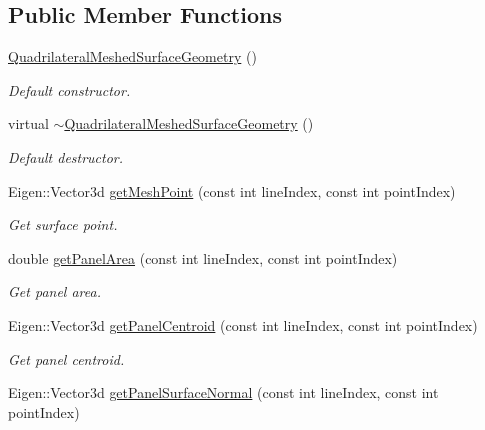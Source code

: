\subsection*{Public Member Functions}
\begin{DoxyCompactItemize}
\item 
\hyperlink{classtudat_1_1geometric__shapes_1_1QuadrilateralMeshedSurfaceGeometry_a2f7ff3d50469568067a7655183d9b115}{Quadrilateral\+Meshed\+Surface\+Geometry} ()
\begin{DoxyCompactList}\small\item\em Default constructor. \end{DoxyCompactList}\item 
virtual \hyperlink{classtudat_1_1geometric__shapes_1_1QuadrilateralMeshedSurfaceGeometry_aee32ab94bdba6e333c6e66b01c134522}{$\sim$\+Quadrilateral\+Meshed\+Surface\+Geometry} ()
\begin{DoxyCompactList}\small\item\em Default destructor. \end{DoxyCompactList}\item 
Eigen\+::\+Vector3d \hyperlink{classtudat_1_1geometric__shapes_1_1QuadrilateralMeshedSurfaceGeometry_a41d3852659958f92057e07fddff2a840}{get\+Mesh\+Point} (const int line\+Index, const int point\+Index)
\begin{DoxyCompactList}\small\item\em Get surface point. \end{DoxyCompactList}\item 
double \hyperlink{classtudat_1_1geometric__shapes_1_1QuadrilateralMeshedSurfaceGeometry_a6beee24198f83eb120f55783d05934bf}{get\+Panel\+Area} (const int line\+Index, const int point\+Index)
\begin{DoxyCompactList}\small\item\em Get panel area. \end{DoxyCompactList}\item 
Eigen\+::\+Vector3d \hyperlink{classtudat_1_1geometric__shapes_1_1QuadrilateralMeshedSurfaceGeometry_a3fa483fe82cdf7093065bed466a08721}{get\+Panel\+Centroid} (const int line\+Index, const int point\+Index)
\begin{DoxyCompactList}\small\item\em Get panel centroid. \end{DoxyCompactList}\item 
Eigen\+::\+Vector3d \hyperlink{classtudat_1_1geometric__shapes_1_1QuadrilateralMeshedSurfaceGeometry_aaa04536ce64c5916fc8d6407242747bd}{get\+Panel\+Surface\+Normal} (const int line\+Index, const int point\+Index)

\end{DoxyCompactItemize}
